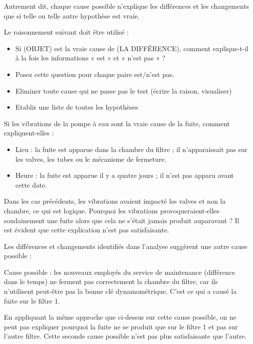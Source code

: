 Autrement dit, chaque cause possible n'explique les différences et les changements que si telle ou telle autre hypothèse est vraie. 


Le raisonnement suivant doit être utilisé :
\begin{itemize}
\item 	Si (OBJET) est la vraie cause de (LA DIFFÉRENCE), comment explique-t-il à la fois les informations « est » et « n'est pas » ?
\item 	Posez cette question pour chaque paire est/n'est pas.
\item 	Eliminer toute cause qui ne passe pas le test (écrire la raison, visualiser)
\item 	Etablir une liste de toutes les hypothèses
\end{itemize}

Si les vibrations de la pompe à eau sont la vraie cause de la fuite, comment expliquent-elles :
\begin{itemize}
\item 	Lieu : la fuite est apparue dans la chambre du filtre ; il n'apparaissait pas sur les valves, les tubes ou le mécanisme de fermeture.
\item 	Heure : la fuite est apparue il y a quatre jours ; il n'est pas apparu avant cette date.
\end{itemize}

Dans les cas précédents, les vibrations avaient impacté les valves et non la chambre, ce qui est logique. Pourquoi les vibrations provoqueraient-elles soudainement une fuite alors que cela ne s'était jamais produit auparavant ? Il est évident que cette explication n'est pas satisfaisante.
\vspace{0.3cm}

Les différences et changements identifiés dans l'analyse suggèrent une autre cause possible : 
\vspace{0.3cm}

Cause possible : les nouveaux employés du service de maintenance (différence dans le temps) ne ferment pas correctement la chambre du filtre, car ils n'utilisent peut-être pas la bonne clé dynamométrique. C'est ce qui a causé la fuite sur le filtre 1.
\vspace{0.3cm}

En appliquant la même approche que ci-dessus sur cette cause possible, on ne peut pas expliquer pourquoi la fuite ne se produit que sur le filtre 1 et pas sur l'autre filtre. Cette seconde cause possible n'est pas plus satisfaisante que l'autre.
\vspace{0.3cm}

